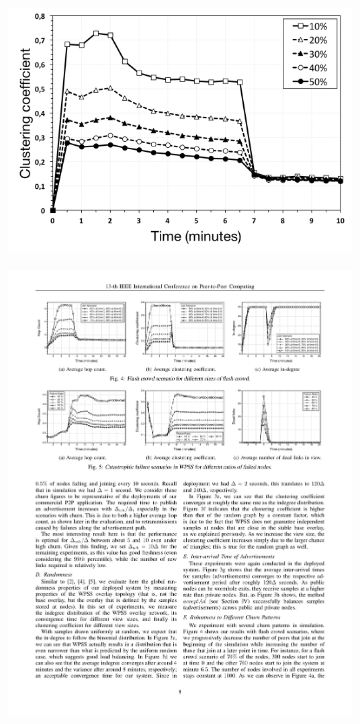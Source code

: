 \begin{figure}
\centering
\begin{subfigure}{.5\textwidth}
  \centering
  \includegraphics[keepaspectratio=true, width=1\linewidth]{images/average_clustering_coefficient_flash_crowd}
  \caption{}
  \label{fig:average_clustering_coefficient_flash_crowd}
\end{subfigure}%
\begin{subfigure}{.5\textwidth}
  \centering
  \includegraphics[keepaspectratio=true, width=1\linewidth]{images/paper_average_clustering_coefficient_flash_crowd}

\end{subfigure}
\end{figure}
